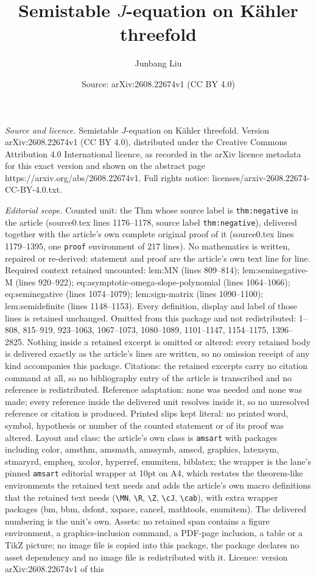 \documentclass[10pt,a4paper]{amsart}
\title[Semistable $J$-equation on K\"ahler threefold]{Semistable $J$-equation on K\"ahler threefold}
\author{Junbang Liu}
\date{Source: arXiv:2608.22674v1 (CC BY 4.0)}
\begin{document}
\maketitle

\noindent\emph{Source and licence.} Semistable $J$-equation on K\"ahler threefold. Version arXiv:2608.22674v1 (CC BY 4.0), distributed under the Creative Commons Attribution 4.0 International licence, as recorded in the arXiv licence metadata for this exact version and shown on the abstract page https://arxiv.org/abs/2608.22674v1. Full rights notice: licenses/arxiv-2608.22674-CC-BY-4.0.txt.\par\smallskip

\noindent\textit{Editorial scope.} Counted unit: the Thm whose source label is \texttt{thm:negative} in the article (source0.tex lines 1176--1178, source label \texttt{thm:negative}), delivered together with the article's own complete original proof of it (source0.tex lines 1179--1395, one \texttt{proof} environment of 217 lines). No mathematics is written, repaired or re-derived: statement and proof are the article's own text line for line. Required context retained uncounted: lem:MN (lines 809--814); lem:seminegative-M (lines 920--922); eq:asymptotic-omega-slope-polynomial (lines 1064--1066); eq:seminegative (lines 1074--1079); lem:sign-matrix (lines 1090--1100); lem:semidefinite (lines 1148--1153). Every definition, display and label of those lines is retained unchanged. Omitted from this package and not redistributed: 1--808, 815--919, 923--1063, 1067--1073, 1080--1089, 1101--1147, 1154--1175, 1396--2825. Nothing inside a retained excerpt is omitted or altered: every retained body is delivered exactly as the article's lines are written, so no omission receipt of any kind accompanies this package. Citations: the retained excerpts carry no citation command at all, so no bibliography entry of the article is transcribed and no reference is redistributed. Reference adaptation: none was needed and none was made; every reference inside the delivered unit resolves inside it, so no unresolved reference or citation is produced. Printed slips kept literal: no printed word, symbol, hypothesis or number of the counted statement or of its proof was altered. Layout and class: the article's own class is \texttt{amsart} with packages including color, amsthm, amsmath, amssymb, amscd, graphics, latexsym, stmaryrd, empheq, xcolor, hyperref, enumitem, biblatex; the wrapper is the lane's pinned \texttt{amsart} editorial wrapper at 10pt on A4, which restates the theorem-like environments the retained text needs and adds the article's own macro definitions that the retained text needs (\texttt{\textbackslash MN}, \texttt{\textbackslash R}, \texttt{\textbackslash Z}, \texttt{\textbackslash cJ}, \texttt{\textbackslash cab}), with extra wrapper packages (bm, bbm, dsfont, xspace, cancel, mathtools, enumitem). The delivered numbering is the unit's own. Assets: no retained span contains a figure environment, a graphics-inclusion command, a PDF-page inclusion, a table or a TikZ picture; no image file is copied into this package, the package declares no asset dependency and no image file is redistributed with it. Licence: version arXiv:2608.22674v1 of this 
\end{document}
